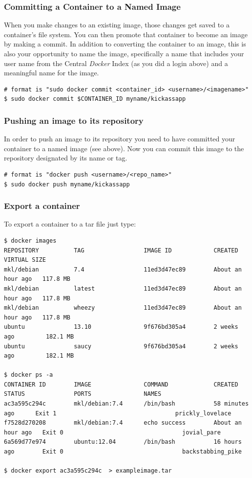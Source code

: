 \documentclass[captions=tableheading]{article}
\begin{document}
\subsubsection{Committing a Container to a Named Image}
\label{sec-2-2-8}

When you make changes to an existing image, those changes get saved to a container’s file system. You can then promote that container to become an image by making a commit. In addition to converting the container to an image, this is also your opportunity to name the image, specifically a name that includes your user name from the Central \emph{Docker} Index (as you did a login above) and a meaningful name for the image.

\begin{verbatim}
# format is "sudo docker commit <container_id> <username>/<imagename>"
$ sudo docker commit $CONTAINER_ID myname/kickassapp
\end{verbatim}
\subsubsection{Pushing an image to its repository}
\label{sec-2-2-9}

In order to push an image to its repository you need to have committed your container to a named image (see above).
Now you can commit this image to the repository designated by its name or tag.

\begin{verbatim}
# format is "docker push <username>/<repo_name>"
$ sudo docker push myname/kickassapp
\end{verbatim}
\subsubsection{Export a container}
\label{sec-2-2-10}

To export a container to a tar file just type:

\begin{verbatim}
$ docker images
REPOSITORY          TAG                 IMAGE ID            CREATED             VIRTUAL SIZE
mkl/debian          7.4                 11ed3d47ec89        About an hour ago   117.8 MB
mkl/debian          latest              11ed3d47ec89        About an hour ago   117.8 MB
mkl/debian          wheezy              11ed3d47ec89        About an hour ago   117.8 MB
ubuntu              13.10               9f676bd305a4        2 weeks ago         182.1 MB
ubuntu              saucy               9f676bd305a4        2 weeks ago         182.1 MB

$ docker ps -a
CONTAINER ID        IMAGE               COMMAND             CREATED             STATUS              PORTS               NAMES
ac3a595c294c        mkl/debian:7.4      /bin/bash           58 minutes ago      Exit 1                                  prickly_lovelace    
f7528d270208        mkl/debian:7.4      echo success        About an hour ago   Exit 0                                  jovial_pare         
6a569d77e974        ubuntu:12.04        /bin/bash           16 hours ago        Exit 0                                  backstabbing_pike 

$ docker export ac3a595c294c  > exampleimage.tar
\end{verbatim}
\end{document}
